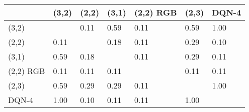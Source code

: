 \begin{tabular}{lllllll}
\hline
           & (3,2)   & (2,2)   & (3,1)   & (2,2) RGB   & (2,3)   & DQN-4   \\
\hline
 (3,2)     &         & 0.11    & 0.59    & 0.11        & 0.59    & 1.00    \\
 (2,2)     & 0.11    &         & 0.18    & 0.11        & 0.29    & 0.10    \\
 (3,1)     & 0.59    & 0.18    &         & 0.11        & 0.29    & 0.11    \\
 (2,2) RGB & 0.11    & 0.11    & 0.11    &             & 0.11    & 0.11    \\
 (2,3)     & 0.59    & 0.29    & 0.29    & 0.11        &         & 1.00    \\
 DQN-4     & 1.00    & 0.10    & 0.11    & 0.11        & 1.00    &         \\
\hline
\end{tabular}